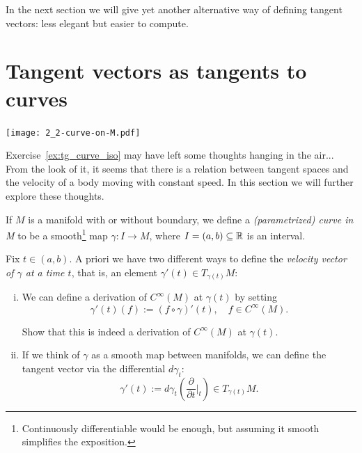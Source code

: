 In the next section we will give yet another alternative way of defining tangent vectors: less elegant but easier to compute.


\section{Tangent vectors as tangents to curves}

\begin{marginfigure}[1em]
	\texttt{[image: 2\_2-curve-on-M.pdf]}
\end{marginfigure}

Exercise~\ref{ex:tg_curve_iso} may have left some thoughts hanging in the air...
From the look of it, it seems that there is a relation between tangent spaces and the velocity of a body moving with constant speed.
In this section we will further explore these thoughts.

\begin{definition}
	If $M$ is a manifold with or without boundary, we define a \emph{(parametrized) curve in M} to be a smooth\footnote{Continuously differentiable would be enough, but assuming it smooth simplifies the exposition.} map $\gamma : I \to M$, where $I=(a,b)\subseteq\mathbb{R}$ is an interval.
\end{definition}

Fix $t\in(a,b)$.
A priori we have two different ways to define the \emph{velocity vector of $\gamma$ at a time $t$}, that is, an element $\gamma'(t) \in T_{\gamma(t)}M$:
\begin{enumerate}[(i)]
	\item We can define a derivation of $C^\infty(M)$ at $\gamma(t)$ by setting
	      \begin{equation}\label{eq:tg_curve_der}
		      \gamma'(t) (f) := (f\circ\gamma)'(t), \quad f\in C^\infty(M).
	      \end{equation}
	      \begin{exercise}
		      Show that this is indeed a derivation of $C^\infty(M)$ at $\gamma(t)$.
	      \end{exercise}
	\item If we think of $\gamma$ as a smooth map between manifolds, we can define the tangent vector via the differential $d\gamma_t$:
	      \begin{equation}\label{eq:tg_curve_diff}
		      \gamma'(t):= d\gamma_t\left(\frac{\partial}{\partial t}\Big|_t\right) \in T_{\gamma(t)}M.
	      \end{equation}
\end{enumerate}

